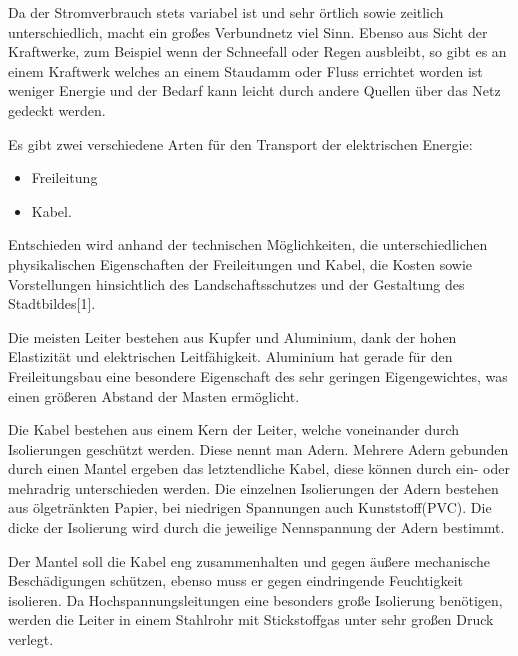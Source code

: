 Da der Stromverbrauch stets variabel ist und sehr örtlich sowie zeitlich unterschiedlich, macht ein großes Verbundnetz viel Sinn. Ebenso aus Sicht der Kraftwerke, zum Beispiel wenn der Schneefall oder Regen ausbleibt, so gibt es an einem Kraftwerk welches an einem Staudamm oder Fluss errichtet worden ist weniger Energie und der Bedarf kann leicht durch andere Quellen über das Netz gedeckt werden.\newline

Es gibt zwei verschiedene Arten für den Transport der elektrischen Energie:
\begin{itemize}
	\item Freileitung
	\item Kabel.
\end{itemize} 
Entschieden wird anhand der technischen Möglichkeiten, die unterschiedlichen physikalischen Eigenschaften der Freileitungen und Kabel, die Kosten sowie Vorstellungen hinsichtlich des Landschaftsschutzes und der Gestaltung des Stadtbildes[1].

Die meisten Leiter bestehen aus Kupfer und Aluminium, dank der hohen Elastizität und elektrischen Leitfähigkeit. Aluminium hat gerade für den Freileitungsbau eine besondere Eigenschaft des sehr geringen Eigengewichtes, was einen größeren Abstand der Masten ermöglicht.

Die Kabel bestehen aus einem Kern der Leiter, welche voneinander durch Isolierungen geschützt werden. Diese nennt man Adern. Mehrere Adern gebunden durch einen Mantel ergeben das letztendliche Kabel, diese können durch ein- oder mehradrig unterschieden werden. Die einzelnen Isolierungen der Adern bestehen aus ölgetränkten Papier, bei niedrigen Spannungen auch Kunststoff(PVC). Die dicke der Isolierung wird durch die jeweilige Nennspannung der Adern bestimmt.

Der Mantel soll die Kabel eng zusammenhalten und gegen äußere mechanische Beschädigungen schützen, ebenso muss er gegen eindringende Feuchtigkeit isolieren. Da Hochspannungsleitungen eine besonders große Isolierung benötigen, werden die Leiter in einem Stahlrohr mit Stickstoffgas unter sehr großen Druck verlegt.


